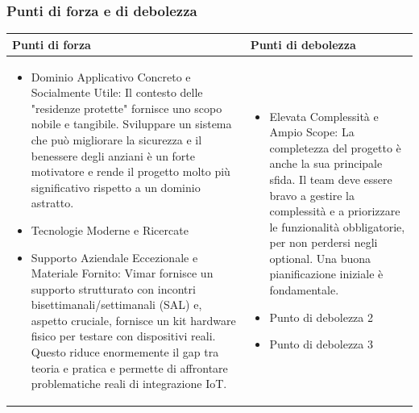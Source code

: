 \documentclass[a4paper,11pt]{article}
\begin{document}
\subsubsection{Punti di forza e di debolezza}
{\footnotesize
\begin{tabularx}{\textwidth}{|X|X|}
\hline
\rowcolor{lightgray!40} %
\textbf{Punti di forza} & \textbf{Punti di debolezza} \\
\hline
\begin{itemize}
\item Dominio Applicativo Concreto e Socialmente Utile: Il contesto delle "residenze protette" fornisce uno scopo nobile e tangibile. Sviluppare un sistema che può migliorare la sicurezza e il benessere degli anziani è un forte motivatore e rende il progetto molto più significativo rispetto a un dominio astratto.
\item Tecnologie Moderne e Ricercate
\item Supporto Aziendale Eccezionale e Materiale Fornito: Vimar fornisce un supporto strutturato con incontri bisettimanali/settimanali (SAL) e, aspetto cruciale, fornisce un kit hardware fisico per testare con dispositivi reali. Questo riduce enormemente il gap tra teoria e pratica e permette di affrontare problematiche reali di integrazione IoT.

\end{itemize}
 & \begin{itemize}
\item Elevata Complessità e Ampio Scope: La completezza del progetto è anche la sua principale sfida. Il team deve essere bravo a gestire la complessità e a priorizzare le funzionalità obbligatorie, per non perdersi negli optional. Una buona pianificazione iniziale è fondamentale.
\item Punto di debolezza 2
\item Punto di debolezza 3
\end{itemize} \\
\hline
\end{tabularx}
}
\end{document}

